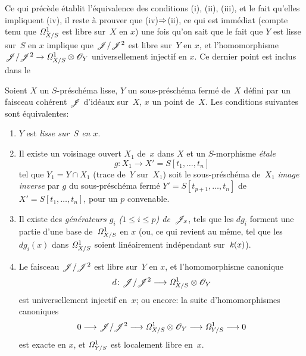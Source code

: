 Ce qui pr\'ec\`ede \'etablit l'\'equivalence des conditions
(i), (ii), (iii), et le fait qu'elles impliquent (iv), il reste \`a
prouver que (iv)$\To$(ii), ce qui est imm\'ediat (compte
tenu que $\it{\Omega}^1_{X/S}$ est libre sur~$X$ en $x$) une fois
qu'on sait que le fait que $Y$ est lisse sur~$S$ en $x$ implique que
$\cal{J}/\cal{J}^2$ est libre sur~$Y$ en $x$, et l'homomorphisme
$\cal{J}/\cal{J}^2 \to \it{\Omega}^1_{X/S}\otimes \cal{O}_Y$
universellement injectif en $x$. Ce dernier point est inclus dans le
\begin{theoreme}
\label{II.4.10}
Soient $X$ un $S$-pr\'esch\'ema lisse, $Y$ un
sous-pr\'esch\'ema ferm\'e de~$X$ d\'efini par un faisceau
coh\'erent $\cal{J}$ d'id\'eaux sur~$X$, $x$ un point de~$X$. Les
conditions suivantes sont \'equivalentes:
\begin{enumerate}
\item[(i)] $Y$ est \emph{lisse sur~$S$ en $x$}.
\item[(ii)] Il existe un voisinage ouvert $X_1$ de~$x$ dans $X$ et un
$S$-morphisme \emph{étale}
$$
g\colon X_1 \to X'=S[t_1,\dots,t_n]
$$
tel que $Y_1=Y \cap X_1$ (trace de~$Y$ sur~$X_1$) soit le
sous-pr\'esch\'ema de~$X_1$ \emph{image inverse} par $g$ du
sous-pr\'esch\'ema ferm\'e $Y'=S[t_{p+1},\dots,t_n]$ de
$X'=S[t_1,\dots,t_n]$, pour un $p$ convenable.
\item[(iii)] Il existe des \emph{générateurs $g_i$ ($1 \leq i
\leq p$) de~$\cal{J}_x$}, tels que les $dg_i$ forment une partie d'une
base de~$\it{\Omega}^1_{X/S}$ en $x$ (ou, ce qui revient au m\^eme,
tel que les $dg_i(x)$ dans $\it{\Omega}^1_{X/S}$ soient
lin\'eairement ind\'ependant sur~$\kres(x)$).
\item[(iv)] Le faisceau $\cal{J}/\cal{J}^2$ est libre sur~$Y$ en $x$,
et l'homomorphisme canonique
$$
d\colon \cal{J}/\cal{J}^2 \to \it{\Omega}^1_{X/S}\otimes \cal{O}_Y
$$
est universellement injectif en~$x$; ou encore: la suite
d'homomorphismes canoniques
$$
0 \to \cal{J}/\cal{J}^2 \to \it{\Omega}^1_{X/S}\otimes \cal{O}_Y \to
\it{\Omega}^1_{Y/S} \to 0
$$
est exacte en $x$, et $\it{\Omega}^1_{Y/S}$ est localement libre
en~$x$.
\end{enumerate}
\end{theoreme}

